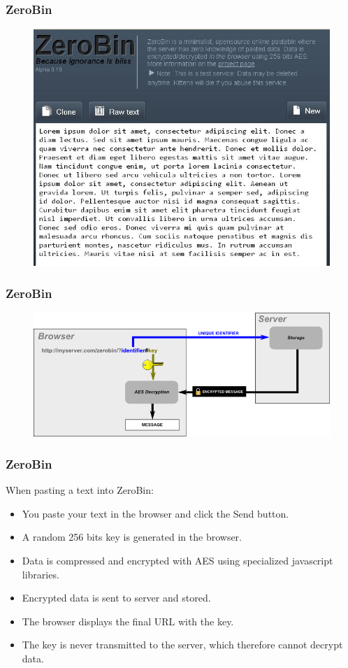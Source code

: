 \begin{frame}
\frametitle{ZeroBin}

\begin{figure}
\includegraphics[width=0.5\linewidth]{./materials/Zerobin.jpg}
\end{figure}
\end{frame}

\begin{frame}
\frametitle{ZeroBin}
\begin{figure}
\includegraphics[width=0.8\linewidth]{./materials/zerobin_figure_decryption.png}
\end{figure}
\end{frame}

\begin{frame}
\frametitle{ZeroBin}
When pasting a text into ZeroBin:
\begin{itemize}
\item You paste your text in the browser and click the Send button.
\item A random 256 bits key is generated in the browser.
\item Data is compressed and encrypted with AES using specialized javascript libraries.
\item Encrypted data is sent to server and stored.
\item The browser displays the final URL with the key.
\item The key is never transmitted to the server, which therefore cannot decrypt data.
\end{itemize}
\end{frame}

